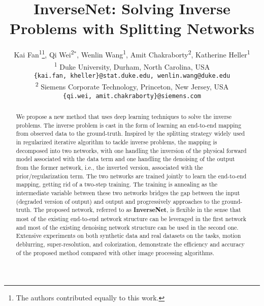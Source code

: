 \documentclass[10pt,twocolumn,letterpaper]{article}
\begin{document}
\graphicspath{{figures/}}



\title{InverseNet: Solving Inverse Problems with Splitting Networks}

\author{
Kai Fan\textsuperscript{1}\thanks{The authors contributed equally to this work.}, Qi Wei\textsuperscript{2}$^{\ast}$, Wenlin Wang\textsuperscript{1}, Amit Chakraborty\textsuperscript{2}, Katherine Heller\textsuperscript{1} \\
\textsuperscript{1} Duke University, Durham, North Carolina, USA\\
{\tt\small \{kai.fan, kheller\}@stat.duke.edu, wenlin.wang@duke.edu} \\
\textsuperscript{2} Siemens Corporate Technology, Princeton, New Jersey, USA\\
{\tt\small \{qi.wei, amit.chakraborty\}@siemens.com}
}

\maketitle

\begin{abstract}
We propose a new method that uses deep learning techniques to solve the inverse problems. 
The inverse problem is cast in the form of learning an end-to-end mapping from observed data to the ground-truth. 
Inspired by the splitting strategy widely used in regularized iterative algorithm to tackle inverse problems,
the mapping is decomposed into two networks, with one handling the inversion of the physical forward model 
associated with the data term and one handling the denoising of the output from the former network, i.e., 
the inverted version, associated with the prior/regularization term. The two networks are trained jointly 
to learn the end-to-end mapping, getting rid of a two-step training. The training is annealing as the 
intermediate variable between these two networks bridges the gap between the input (degraded version of output)
and output and progressively approaches to the ground-truth. The proposed network, referred to as \textbf{InverseNet},
is flexible in the sense that most of the existing end-to-end network structure can be leveraged in 
the first network and most of the existing denoising network structure can be used in the second one. 
Extensive experiments on both synthetic data and real datasets on the tasks, motion deblurring, super-resolution, and colorization, demonstrate the efficiency and accuracy of the proposed method compared with other image processing algorithms. 
\end{abstract}
\end{document}
